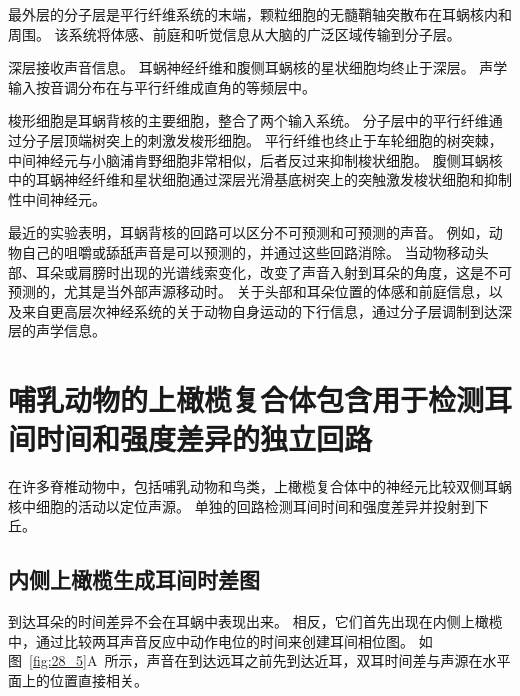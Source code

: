 最外层的分子层是平行纤维系统的末端，颗粒细胞的无髓鞘轴突散布在耳蜗核内和周围。
该系统将体感、前庭和听觉信息从大脑的广泛区域传输到分子层。


深层接收声音信息。
耳蜗神经纤维和腹侧耳蜗核的星状细胞均终止于深层。
声学输入按音调分布在与平行纤维成直角的等频层中。


梭形细胞是耳蜗背核的主要细胞，整合了两个输入系统。
分子层中的平行纤维通过分子层顶端树突上的刺激发梭形细胞。
平行纤维也终止于车轮细胞的树突棘，中间神经元与小脑浦肯野细胞非常相似，后者反过来抑制梭状细胞。
腹侧耳蜗核中的耳蜗神经纤维和星状细胞通过深层光滑基底树突上的突触激发梭状细胞和抑制性中间神经元。


最近的实验表明，耳蜗背核的回路可以区分不可预测和可预测的声音。
例如，动物自己的咀嚼或舔舐声音是可以预测的，并通过这些回路消除。
当动物移动头部、耳朵或肩膀时出现的光谱线索变化，改变了声音入射到耳朵的角度，这是不可预测的，尤其是当外部声源移动时。
关于头部和耳朵位置的体感和前庭信息，以及来自更高层次神经系统的关于动物自身运动的下行信息，通过分子层调制到达深层的声学信息。



\section{哺乳动物的上橄榄复合体包含用于检测耳间时间和强度差异的独立回路}

在许多脊椎动物中，包括哺乳动物和鸟类，上橄榄复合体中的神经元比较双侧耳蜗核中细胞的活动以定位声源。
单独的回路检测耳间时间和强度差异并投射到下丘。



\subsection{内侧上橄榄生成耳间时差图}

到达耳朵的时间差异不会在耳蜗中表现出来。
相反，它们首先出现在内侧上橄榄中，通过比较两耳声音反应中动作电位的时间来创建耳间相位图。
如图~\ref{fig:28_5}A~所示，声音在到达远耳之前先到达近耳，双耳时间差与声源在水平面上的位置直接相关。


